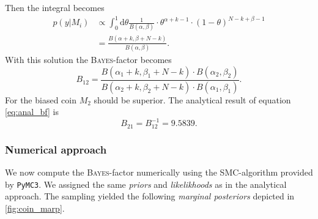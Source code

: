 \documentclass[%
 reprint,
 amsmath,amssymb,
 aps,
]{revtex4-1}
\begin{document}
Then the integral becomes 
\begin{align*}
	p(y|M_i)&\propto \int_{0}^{1} \text{d}\theta \frac{1}{B(\alpha,\beta)} \cdot \theta^{\alpha+k-1}\cdot (1-\theta)^{N-k+\beta-1}\\
	&=\frac{B(\alpha+k,\beta+N-k)}{B(\alpha, \beta)}.
\end{align*}
With this solution the \textsc{Bayes}-factor becomes
\begin{equation}\label{eq:anal_bf}
	B_{12}=\frac{B(\alpha_1+k,\beta_1+N-k)\cdot B(\alpha_2,\beta_2)}{B(\alpha_2+k,\beta_2+N-k)\cdot B(\alpha_1,\beta_1)}.
\end{equation}
For the biased coin $M_2$ should be superior. The analytical result of equation \eqref{eq:anal_bf} is $$B_{21}=B_{12}^{-1}=9.5839.$$

\subsubsection{Numerical approach}
We now compute the \textsc{Bayes}-factor numerically using the SMC-algorithm provided by \texttt{PyMC3}. We assigned the same \emph{priors} and \emph{likelikhoods} as in the analytical approach. The sampling yielded the following \emph{marginal posteriors} depicted in \eqref{fig:coin_marp}.
\end{document}

